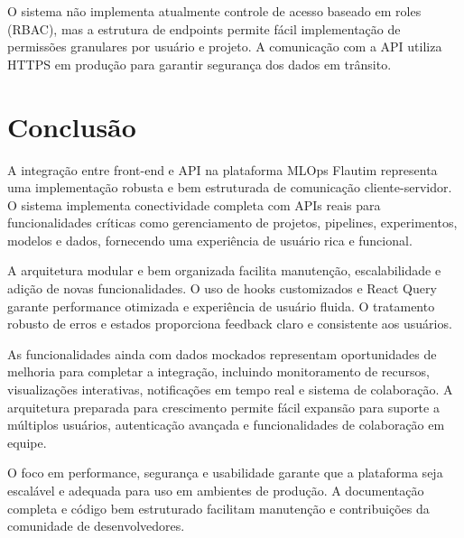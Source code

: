 \documentclass[12pt,a4paper]{article}
\begin{document}
O sistema não implementa atualmente controle de acesso baseado em roles (RBAC), mas a estrutura de endpoints permite fácil implementação de permissões granulares por usuário e projeto. A comunicação com a API utiliza HTTPS em produção para garantir segurança dos dados em trânsito.

\section{Conclusão}

A integração entre front-end e API na plataforma MLOps Flautim representa uma implementação robusta e bem estruturada de comunicação cliente-servidor. O sistema implementa conectividade completa com APIs reais para funcionalidades críticas como gerenciamento de projetos, pipelines, experimentos, modelos e dados, fornecendo uma experiência de usuário rica e funcional.

A arquitetura modular e bem organizada facilita manutenção, escalabilidade e adição de novas funcionalidades. O uso de hooks customizados e React Query garante performance otimizada e experiência de usuário fluida. O tratamento robusto de erros e estados proporciona feedback claro e consistente aos usuários.

As funcionalidades ainda com dados mockados representam oportunidades de melhoria para completar a integração, incluindo monitoramento de recursos, visualizações interativas, notificações em tempo real e sistema de colaboração. A arquitetura preparada para crescimento permite fácil expansão para suporte a múltiplos usuários, autenticação avançada e funcionalidades de colaboração em equipe.

O foco em performance, segurança e usabilidade garante que a plataforma seja escalável e adequada para uso em ambientes de produção. A documentação completa e código bem estruturado facilitam manutenção e contribuições da comunidade de desenvolvedores.
\end{document}
